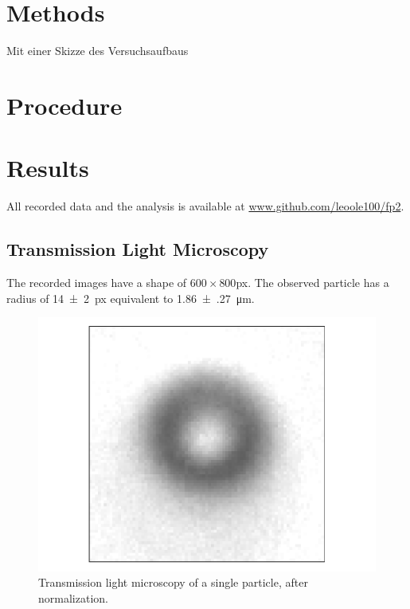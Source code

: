 \documentclass[
    parskip=half, 
    twoside=false,
    twocolumn=true,
    fontsize=11pt,
]{scrarticle}
\begin{document}
\section{Methods}
Mit einer Skizze des Versuchsaufbaus

\section{Procedure}

\pagebreak
\section{Results}
All recorded data and the analysis is available at \url{www.github.com/leoole100/fp2}.

\subsection{Transmission Light Microscopy}
The recorded images have a shape of $600\times 800$\si{px}.
The observed particle has a radius of \SI{14(2)}{px} equivalent to \SI{1.86(27)}{\micro m}. 
\begin{figure}[h]
    \centering
    \includegraphics{figures/01_01_1_particle.pdf}
    \caption{Transmission light microscopy of a single particle, after normalization.}
\end{figure}
\end{document}
